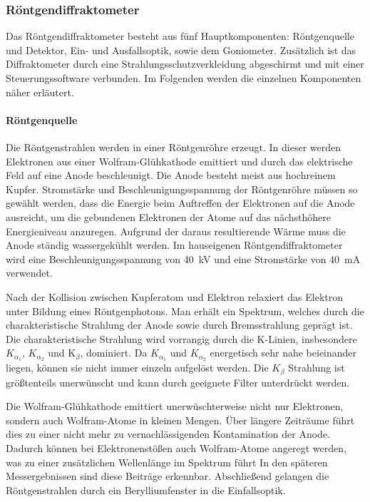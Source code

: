 \subsubsection{Röntgendiffraktometer}
Das Röntgendiffraktometer besteht aus fünf Hauptkomponenten: Röntgenquelle und Detektor, Ein- und Ausfallsoptik,
sowie dem Goniometer.
Zusätzlich ist das Diffraktometer durch eine Strahlungsschutzverkleidung abgeschirmt und mit einer Steuerungssoftware
verbunden.
Im Folgenden werden die einzelnen Komponenten näher erläutert.

\paragraph{Röntgenquelle}
Die Röntgenstrahlen werden in einer Röntgenröhre erzeugt.
In dieser werden Elektronen aus einer Wolfram-Glühkathode emittiert und durch das elektrische Feld auf eine Anode
beschleunigt.
Die Anode besteht meist aus hochreinem Kupfer.
Stromstärke und Beschleunigungsspannung der Röntgenröhre müssen so gewählt werden, dass die Energie beim Auftreffen der
Elektronen auf die Anode ausreicht, um die gebundenen Elektronen der Atome auf das nächsthöhere Energieniveau anzuregen.
Aufgrund der daraus resultierende Wärme muss die Anode ständig wassergekühlt werden.
Im hauseigenen Röntgendiffraktometer wird eine Beschleunigungsspannung von \qty{40}{\kilo\volt} und eine Stromstärke
von \qty{40}{\milli\ampere} verwendet.

Nach der Kollision zwischen Kupferatom und Elektron relaxiert das Elektron unter Bildung eines Röntgenphotons.
Man erhält ein Spektrum, welches durch die charakteristische Strahlung der Anode sowie durch Bremsstrahlung
geprägt ist.
Die charakteristische Strahlung wird vorrangig durch die K-Linien, insbesondere $K_{\alpha_1}$, $K_{\alpha_2}$
und K$_{\beta}$, dominiert.
Da $K_{\alpha_1}$ und $K_{\alpha_2}$ energetisch sehr nahe beieinander liegen, können sie nicht immer einzeln
aufgelöst werden.
Die $K_{\beta}$ Strahlung ist größtenteils unerwünscht und kann durch geeignete Filter unterdrückt werden.


Die Wolfram-Glühkathode emittiert unerwüschterweise nicht nur Elektronen, sondern auch Wolfram-Atome in kleinen Mengen.
Über längere Zeiträume führt dies zu einer nicht mehr zu vernachlässigenden Kontamination der Anode.
Dadurch können bei Elektronenstößen auch Wolfram-Atome angeregt werden, was zu einer zusätzlichen Wellenlänge im
Spektrum führt
In den späteren Messergebnissen sind diese Beiträge erkennbar.
Abschließend gelangen die Röntgenstrahlen durch ein Berylliumfenster in die Einfallsoptik.

